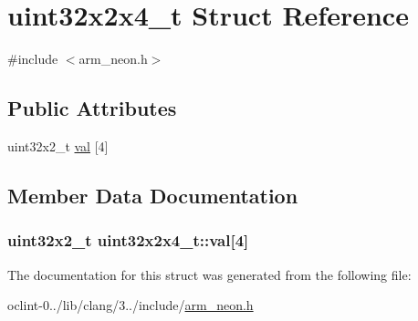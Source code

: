 \hypertarget{structuint32x2x4__t}{\section{uint32x2x4\-\_\-t Struct Reference}
\label{structuint32x2x4__t}
}


{\ttfamily \#include $<$arm\-\_\-neon.\-h$>$}

\subsection*{Public Attributes}
\begin{DoxyCompactItemize}
\item 
uint32x2\-\_\-t \hyperlink{structuint32x2x4__t_a5252c3580c663ffd1ecce6e53a943471}{val} \mbox{[}4\mbox{]}
\end{DoxyCompactItemize}


\subsection{Member Data Documentation}
\hypertarget{structuint32x2x4__t_a5252c3580c663ffd1ecce6e53a943471}{
\subsubsection[{val}]{\setlength{\rightskip}{0pt plus 5cm}uint32x2\-\_\-t uint32x2x4\-\_\-t\-::val\mbox{[}4\mbox{]}}}\label{structuint32x2x4__t_a5252c3580c663ffd1ecce6e53a943471}


The documentation for this struct was generated from the following file\-:\begin{DoxyCompactItemize}
\item 
oclint-\/0../lib/clang/3../include/\hyperlink{arm__neon_8h}{arm\-\_\-neon.\-h}\end{DoxyCompactItemize}
